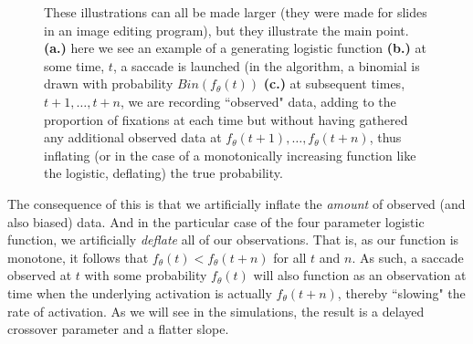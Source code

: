 \documentclass{article}
\begin{document}
\begin{figure}[H]
    \centering
    \caption{These illustrations can all be made larger (they were made for slides in an image editing program), but they illustrate the main point. \textbf{(a.)} here we see an example of a generating logistic function \textbf{(b.)} at some time, $t$, a saccade is launched (in the algorithm, a binomial is drawn with probability $Bin(f_{\theta}(t))$ \textbf{(c.)} at subsequent times, $t+1, \dots, t+n$, we are recording ``observed" data, adding to the proportion of fixations at each time but without having gathered any additional observed data at $f_{\theta}(t+1), \dots,f_{\theta}(t+n)$, thus inflating (or in the case of a monotonically increasing function like the logistic, deflating) the true probability. }
\label{fig:folly_of_fixation}
\end{figure}

The consequence of this is that we artificially inflate the \textit{amount} of observed (and also biased) data. And in the particular case of the four parameter logistic function, we artificially \textit{deflate} all of our observations. That is, as our function is monotone, it follows that $f_{\theta}(t) < f_{\theta}(t+n)$ for all $t$ and $n$. As such, a saccade observed at $t$ with some probability $f_{\theta}(t)$ will also function as an observation at time when the underlying activation is actually $f_{\theta}(t+n)$, thereby ``slowing" the rate of activation. As we will see in the simulations, the result is a delayed crossover parameter and a flatter slope.
\end{document}
